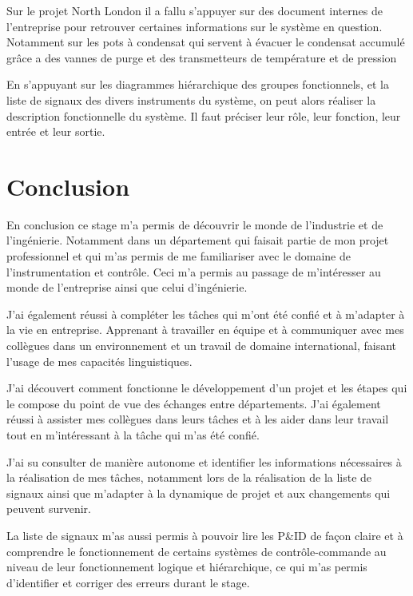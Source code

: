 \documentclass[11pt, openright]{book}
\begin{document}
Sur le projet North London il a fallu s'appuyer sur des document internes de l'entreprise pour retrouver certaines informations sur le système en question. Notamment sur les pots à condensat qui servent à évacuer le condensat accumulé grâce a des vannes de purge et des transmetteurs de température et de pression

En s'appuyant sur les diagrammes hiérarchique des groupes fonctionnels, et la liste de signaux des divers instruments du système, on peut alors réaliser la description fonctionnelle du système. Il faut préciser leur rôle, leur fonction, leur entrée et leur sortie.




\newpage
\section{Conclusion}

En conclusion ce stage m'a permis de découvrir le monde de l'industrie et de l'ingénierie. Notamment dans un département qui faisait partie de mon projet professionnel et qui m'as permis de me familiariser avec le domaine de l'instrumentation et contrôle. Ceci m’a permis au passage de m'intér\-esser au monde de l'entreprise ainsi que celui d'ingénierie.

J'ai également réussi à compléter les tâches qui m'ont été confié et à m'adapter à la vie en entreprise. Apprenant à travailler en équipe et à communiquer avec mes collègues dans un environnement et un travail de domaine international, faisant l'usage de mes capacités linguistiques.

J'ai découvert comment fonctionne le développement d'un projet et les étapes qui le compose du point de vue des échanges entre départements. J'ai également réussi à assister mes collègues dans leurs tâches et à les aider dans leur travail tout en m'intéressant à la tâche qui m'as été confié.

J'ai su consulter de manière autonome et identifier les informations nécessaires à la réalisation de mes tâches, notamment lors de la réalisation de la liste de signaux ainsi que m'adapter à la dynamique de projet et aux changements qui peuvent survenir.

La liste de signaux m'as aussi permis à pouvoir lire les P\&ID de façon claire et à comprendre le fonctionnement de certains systèmes de contrôle-commande au niveau de leur fonctionnement logique et hiérarchique, ce qui m'as permis d'identifier et corriger des erreurs durant le stage.
\end{document}
